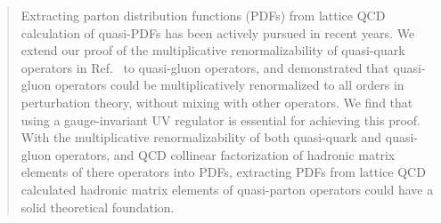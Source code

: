 \begin{abstract}
Extracting parton distribution functions (PDFs) from lattice QCD calculation of quasi-PDFs has been actively pursued in recent years. We extend our proof of the multiplicative renormalizability of quasi-quark operators in Ref.~\cite{Ishikawa:2017faj} to quasi-gluon operators, and demonstrated that quasi-gluon operators could be multiplicatively renormalized to all orders in perturbation theory, without mixing with other operators. We find that using a gauge-invariant UV regulator is essential for achieving this proof.  With the multiplicative renormalizability of both quasi-quark and quasi-gluon operators, and QCD collinear factorization of hadronic matrix elements of there operators into PDFs, extracting PDFs from lattice QCD calculated hadronic matrix elements of quasi-parton operators could have a solid theoretical foundation.
\end{abstract}
